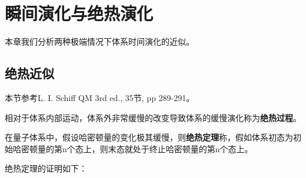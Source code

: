 
\chapter{瞬间演化与绝热演化}
\label{cpt:3}
本章我们分析两种极端情况下体系时间演化的近似。
\section{绝热近似}
\begin{framed}
本节参考L. I. Schiff QM 3rd ed., 35节, pp 289-291。
\end{framed}
相对于体系内部运动，体系外非常缓慢的改变导致体系的缓慢演化称为\textbf{绝热过程}。

在量子体系中，假设哈密顿量的变化极其缓慢，则\textbf{绝热定理}称，假如体系初态为初始哈密顿量的第n个态上，则末态就处于终止哈密顿量的第n个态上。

绝热定理的证明如下：


